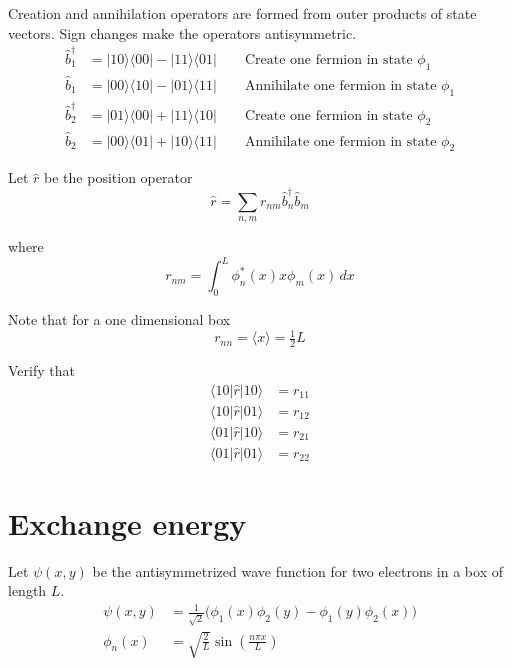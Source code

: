 \documentclass[12pt]{article}
\begin{document}
\noindent
Creation and annihilation operators are formed from outer products of state vectors.
Sign changes make the operators antisymmetric.
\begin{align*}
\hat{b}_1^\dag&=|10\rangle\langle00|-|11\rangle\langle01| \qquad\text{Create one fermion in state $\phi_1$}
\\
\hat{b}_1&=|00\rangle\langle10|-|01\rangle\langle11| \qquad\text{Annihilate one fermion in state $\phi_1$}
\\
\hat{b}_2^\dag&=|01\rangle\langle00|+|11\rangle\langle10| \qquad\text{Create one fermion in state $\phi_2$}
\\
\hat{b}_2&=|00\rangle\langle01|+|10\rangle\langle11| \qquad\text{Annihilate one fermion in state $\phi_2$}
\end{align*}

\noindent
Let $\hat{r}$ be the position operator
\begin{equation*}
\hat{r}=\sum_{n,m}r_{nm}\hat{b}_n^\dag\hat{b}_m
\end{equation*}

\noindent
where
\begin{equation*}
r_{nm}=\int_0^L\phi_n^*(x)x\phi_m(x)\,dx
\end{equation*}

\noindent
Note that for a one dimensional box
\begin{equation*}
r_{nn}=\langle x\rangle=\tfrac{1}{2}L
\end{equation*}

\noindent
Verify that
\begin{align*}
\langle10|\hat{r}|10\rangle&=r_{11}\\
\langle10|\hat{r}|01\rangle&=r_{12}\\
\langle01|\hat{r}|10\rangle&=r_{21}\\
\langle01|\hat{r}|01\rangle&=r_{22}
\end{align*}

\newpage

\section{Exchange energy}
Let $\psi(x,y)$ be the antisymmetrized wave function for two electrons in a box of length $L$.
\begin{align*}
\psi(x,y)&=\frac{1}{\sqrt{2}}
\big(\phi_1(x)\phi_2(y)-\phi_1(y)\phi_2(x)\big)
\\[2ex]
\phi_n(x)&=\sqrt{\frac{2}{L}}\sin\left(\frac{n\pi x}{L}\right)
\end{align*}
\end{document}
